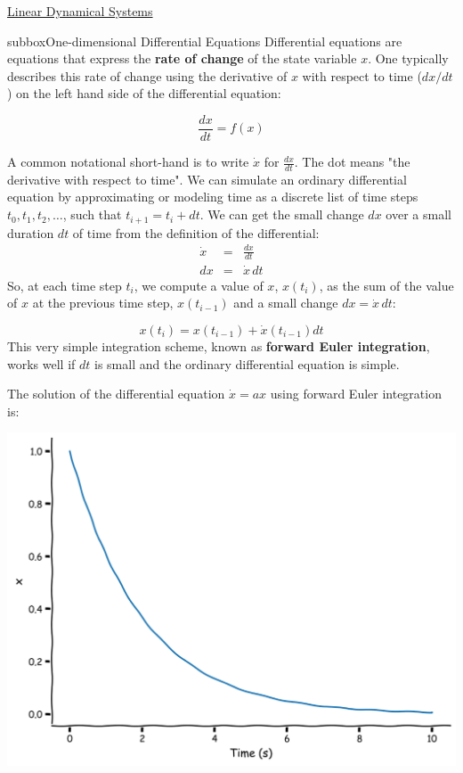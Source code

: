 \begin{textbox}{\href{https://compneuro.neuromatch.io/tutorials/W2D2_LinearSystems/student/W2D2_Tutorial1.html}{Linear Dynamical Systems }   }
\begin{subbox}{subbox}{One-dimensional Differential Equations}
\scriptsize
Differential equations are equations that express the \textbf{rate of change} of the state variable $x$. One typically describes this rate of change using the derivative of $x$ with respect to time ($dx/dt$) on the left hand side of the differential equation:

$$\frac{dx}{dt} = f(x)$$

A common notational short-hand is to write $\dot{x}$ for $\frac{dx}{dt}$. The dot means "the derivative with respect to time".
We can simulate an ordinary differential equation by approximating or modeling time as a discrete list of time steps $t_0, t_1, t_2, \dots$, such that $t_{i+1}=t_i+dt$. We can get the small change $dx$ over a small duration $dt$ of time from the definition of the differential:
\begin{eqnarray}
  \dot x &=& \frac{dx}{dt} \\
  dx     &=& \dot x\, dt  
\end{eqnarray}
So, at each time step $t_i$, we compute a value of $x$, $x(t_i)$, as the sum of the value of $x$ at the previous time step, $x(t_{i-1})$ and a small change $dx=\dot x\,dt$:

$$x(t_i)=x(t_{i-1})+\dot x(t_{i-1}) dt$$
This very simple integration scheme, known as \textbf{forward Euler integration}, works well if $dt$ is small and the ordinary differential equation is simple.

The solution of the differential equation $\dot{x} = a x$ using forward Euler integration is: 

\centering
\includegraphics[scale=0.15]{Figures/LS/LSFigure1.png}
\end{subbox}
\end{textbox}
